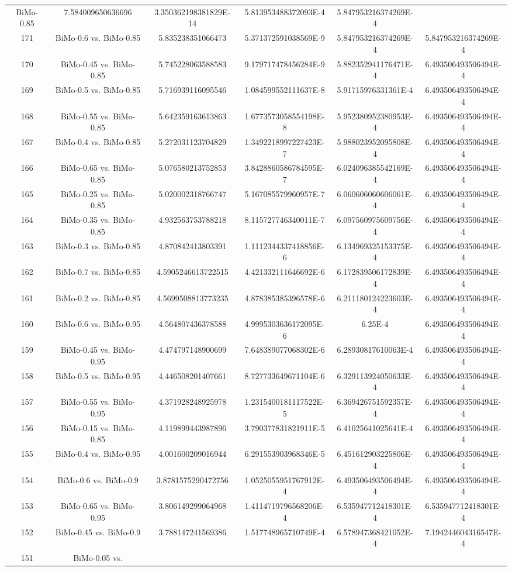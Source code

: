 \documentclass[a4paper,10pt]{article}
\begin{document}
\begin{landscape}
\begin{table}[!htp]
\begin{tabular}{cccccc}
BiMo-0.85&7.584009650636696&3.350362198381829E-14&5.813953488372093E-4&5.847953216374269E-4\\171&BiMo-0.6 vs. BiMo-0.85&5.835238351066473&5.371372591038569E-9&5.847953216374269E-4&5.847953216374269E-4\\170&BiMo-0.45 vs. BiMo-0.85&5.745228063588583&9.179717478456284E-9&5.882352941176471E-4&6.493506493506494E-4\\169&BiMo-0.5 vs. BiMo-0.85&5.716939116095546&1.084599552111637E-8&5.91715976331361E-4&6.493506493506494E-4\\168&BiMo-0.55 vs. BiMo-0.85&5.642359163613863&1.6773573058554198E-8&5.952380952380953E-4&6.493506493506494E-4\\167&BiMo-0.4 vs. BiMo-0.85&5.272031123704829&1.3492218997227423E-7&5.988023952095808E-4&6.493506493506494E-4\\166&BiMo-0.65 vs. BiMo-0.85&5.076580213752853&3.8428860586784595E-7&6.024096385542169E-4&6.493506493506494E-4\\165&BiMo-0.25 vs. BiMo-0.85&5.020002318766747&5.167085579960957E-7&6.060606060606061E-4&6.493506493506494E-4\\164&BiMo-0.35 vs. BiMo-0.85&4.932563753788218&8.115727746340011E-7&6.097560975609756E-4&6.493506493506494E-4\\163&BiMo-0.3 vs. BiMo-0.85&4.870842413803391&1.1112344337418856E-6&6.134969325153375E-4&6.493506493506494E-4\\162&BiMo-0.7 vs. BiMo-0.85&4.5905246613722515&4.421332111646692E-6&6.172839506172839E-4&6.493506493506494E-4\\161&BiMo-0.2 vs. BiMo-0.85&4.5699508813773235&4.878385385396578E-6&6.211180124223603E-4&6.493506493506494E-4\\160&BiMo-0.6 vs. BiMo-0.95&4.564807436378588&4.9995303636172095E-6&6.25E-4&6.493506493506494E-4\\159&BiMo-0.45 vs. BiMo-0.95&4.474797148900699&7.648389077068302E-6&6.28930817610063E-4&6.493506493506494E-4\\158&BiMo-0.5 vs. BiMo-0.95&4.446508201407661&8.727733649671104E-6&6.329113924050633E-4&6.493506493506494E-4\\157&BiMo-0.55 vs. BiMo-0.95&4.371928248925978&1.2315400181117522E-5&6.369426751592357E-4&6.493506493506494E-4\\156&BiMo-0.15 vs. BiMo-0.85&4.119899443987896&3.790377831821911E-5&6.41025641025641E-4&6.493506493506494E-4\\155&BiMo-0.4 vs. BiMo-0.95&4.001600209016944&6.291553903968346E-5&6.451612903225806E-4&6.493506493506494E-4\\154&BiMo-0.6 vs. BiMo-0.9&3.8781575290472756&1.0525055951767912E-4&6.493506493506494E-4&6.493506493506494E-4\\153&BiMo-0.65 vs. BiMo-0.95&3.806149299064968&1.4114719796568206E-4&6.535947712418301E-4&6.535947712418301E-4\\152&BiMo-0.45 vs. BiMo-0.9&3.788147241569386&1.517748965710749E-4&6.578947368421052E-4&7.194244604316547E-4\\151&BiMo-0.05 vs. 
\end{tabular}
\end{table}
\end{landscape}
\end{document}
